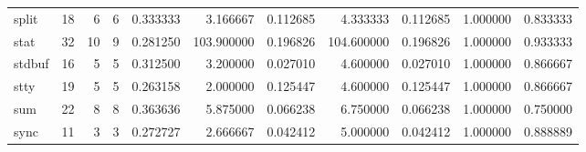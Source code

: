 \begin{tabular}{lrrrrrrrrrr}
split     &                                      18 &                  6 &                                 6 &                                   0.333333 &                               3.166667 &                                     0.112685 &                          4.333333 &                                0.112685 &                           1.000000 &                                           0.833333 \\
stat      &                                      32 &                 10 &                                 9 &                                   0.281250 &                             103.900000 &                                     0.196826 &                        104.600000 &                                0.196826 &                           1.000000 &                                           0.933333 \\
stdbuf    &                                      16 &                  5 &                                 5 &                                   0.312500 &                               3.200000 &                                     0.027010 &                          4.600000 &                                0.027010 &                           1.000000 &                                           0.866667 \\
stty      &                                      19 &                  5 &                                 5 &                                   0.263158 &                               2.000000 &                                     0.125447 &                          4.600000 &                                0.125447 &                           1.000000 &                                           0.866667 \\
sum       &                                      22 &                  8 &                                 8 &                                   0.363636 &                               5.875000 &                                     0.066238 &                          6.750000 &                                0.066238 &                           1.000000 &                                           0.750000 \\
sync      &                                      11 &                  3 &                                 3 &                                   0.272727 &                               2.666667 &                                     0.042412 &                          5.000000 &                                0.042412 &                           1.000000 &                                           0.888889 \\

\end{tabular}
